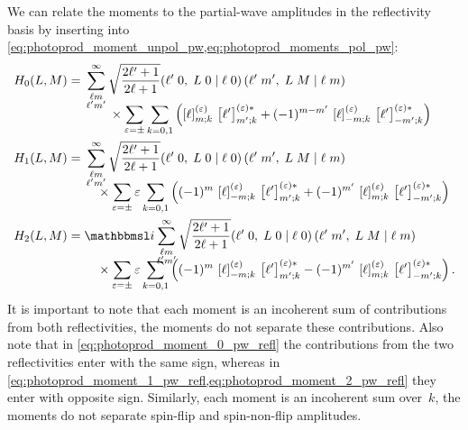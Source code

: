 We can relate the moments to the partial-wave amplitudes in the
reflectivity basis by inserting
 into
\cref{eq:photoprod_moment_unpol_pw,eq:photoprod_moments_pol_pw}:
\begin{align}
  \label{eq:photoprod_moment_0_pw_refl}
  H_0(L, M)
  ={}& \begin{multlined}[t][0.8\columnwidth]
    \sum_{\substack{\ell m \\ \ell' m'}}^\infty \sqrt{\frac{2 \ell' + 1}{2 \ell + 1}}
    \clebsch{\ell'}{0}{L}{0}{\ell}{0}\, \clebsch{\ell'}{m'}{L}{M}{\ell}{m} \\[-2ex]
    \shoveleft{\hfill \times%
      \sum_{\refl = \pm} \sum_{k = 0, 1} \rBrk[2]{\sBrk{\ell}^{(\refl)}_{m; k}\, \sBrk{\ell'}^{(\refl) *}_{m'; k}
      + (-1)^{m - m'}\, \sBrk{\ell}^{(\refl)}_{{-m}; k}\, \sBrk{\ell'}^{(\refl) *}_{{-m'}; k}}
    }
  \end{multlined}
  \\
  \label{eq:photoprod_moment_1_pw_refl}
  H_1(L, M)
  ={}& \begin{multlined}[t][0.8\columnwidth]
    \sum_{\substack{\ell m \\ \ell' m'}}^\infty \sqrt{\frac{2 \ell' + 1}{2 \ell + 1}}
    \clebsch{\ell'}{0}{L}{0}{\ell}{0}\, \clebsch{\ell'}{m'}{L}{M}{\ell}{m} \\[-2ex]
    \shoveleft{\hfill \times%
      \sum_{\refl = \pm} \refl \sum_{k = 0, 1} \rBrk[2]{(-1)^m\, \sBrk{\ell}^{(\refl)}_{{-m}; k}\, \sBrk{\ell'}^{(\refl) *}_{m'; k}
      + (-1)^{m'}\, \sBrk{\ell}^{(\refl)}_{m; k}\, \sBrk{\ell'}^{(\refl) *}_{{-m'}; k}}
    }
  \end{multlined}
  \\
  \label{eq:photoprod_moment_2_pw_refl}
  H_2(L, M)
  ={}& \begin{multlined}[t][0.8\columnwidth]
    \imag \sum_{\substack{\ell m \\ \ell' m'}}^\infty \sqrt{\frac{2 \ell' + 1}{2 \ell + 1}}
    \clebsch{\ell'}{0}{L}{0}{\ell}{0}\, \clebsch{\ell'}{m'}{L}{M}{\ell}{m} \\[-2ex]
    \shoveleft{\hfill \times%
      \sum_{\refl = \pm} \refl \sum_{k = 0, 1} \rBrk[2]{(-1)^m\, \sBrk{\ell}^{(\refl)}_{{-m}; k}\, \sBrk{\ell'}^{(\refl) *}_{m'; k}
      - (-1)^{m'}\, \sBrk{\ell}^{(\refl)}_{m; k}\, \sBrk{\ell'}^{(\refl) *}_{{-m'}; k}}
    }.
  \end{multlined}
\end{align}
It is important to note that each moment is an incoherent sum of
contributions from both reflectivities, \ie the moments do not
separate these contributions.  Also note that in
\cref{eq:photoprod_moment_0_pw_refl} the contributions from the two
reflectivities enter with the same sign, whereas in
\cref{eq:photoprod_moment_1_pw_refl,eq:photoprod_moment_2_pw_refl}
they enter with opposite sign.  Similarly, each moment is an
incoherent sum over~$k$, \ie the moments do not separate spin-flip and
spin-non-flip amplitudes.

